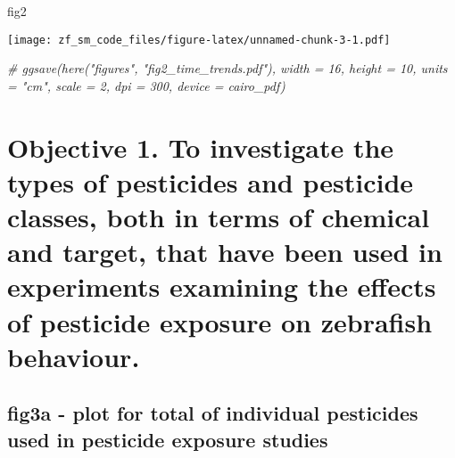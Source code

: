 \documentclass[
]{article}
\newenvironment{Shaded}{\begin{snugshade}}{\end{snugshade}}
\newcommand{\CommentTok}[1]{\textcolor[rgb]{0.56,0.35,0.01}{\textit{#1}}}
\newcommand{\NormalTok}[1]{#1}
\begin{document}
\begin{Shaded}
\begin{Highlighting}[]
\NormalTok{fig2}
\end{Highlighting}
\end{Shaded}

\texttt{[image: zf\_sm\_code\_files/figure-latex/unnamed-chunk-3-1.pdf]}

\begin{Shaded}
\begin{Highlighting}[]
\CommentTok{\# ggsave(here("figures", "fig2\_time\_trends.pdf"), width = 16, height = 10, units = "cm", scale = 2, dpi = 300, device = cairo\_pdf)}
\end{Highlighting}
\end{Shaded}

\hypertarget{objective-1.-to-investigate-the-types-of-pesticides-and-pesticide-classes-both-in-terms-of-chemical-and-target-that-have-been-used-in-experiments-examining-the-effects-of-pesticide-exposure-on-zebrafish-behaviour.}{%
\section{Objective 1. To investigate the types of pesticides and
pesticide classes, both in terms of chemical and target, that have been
used in experiments examining the effects of pesticide exposure on
zebrafish
behaviour.}\label{objective-1.-to-investigate-the-types-of-pesticides-and-pesticide-classes-both-in-terms-of-chemical-and-target-that-have-been-used-in-experiments-examining-the-effects-of-pesticide-exposure-on-zebrafish-behaviour.}}

\hypertarget{fig3a---plot-for-total-of-individual-pesticides-used-in-pesticide-exposure-studies}{%
\subsection{fig3a - plot for total of individual pesticides used in
pesticide exposure
studies}\label{fig3a---plot-for-total-of-individual-pesticides-used-in-pesticide-exposure-studies}}
\end{document}
